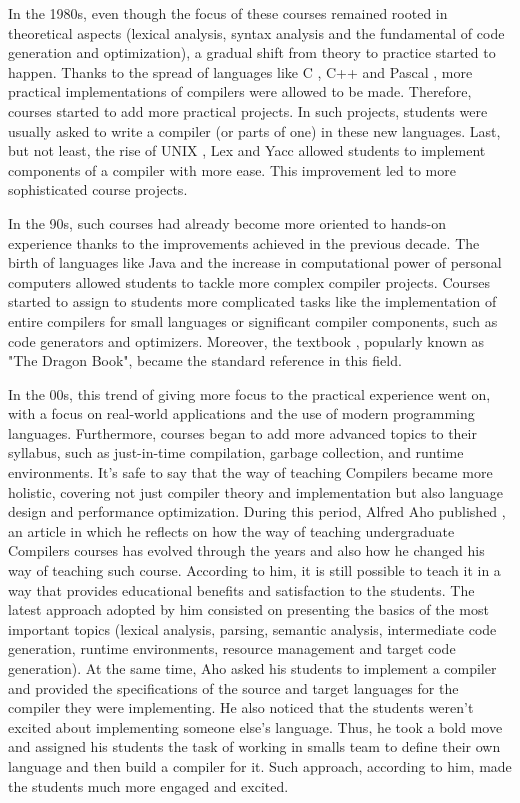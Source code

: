 In the 1980s, even though the focus of these courses remained rooted in theoretical aspects (lexical analysis, syntax analysis and the fundamental of code generation and optimization), a gradual shift from theory to practice started to happen. Thanks to the spread of languages like C \cite{kernighan1988c}, C++ \cite{strousrup2000c++} and Pascal \cite{wirth1971programming}, more practical implementations of compilers were allowed to be made. Therefore, courses started to add more practical projects. In such projects, students were usually asked to write a compiler (or parts of one) in these new languages. Last, but not least, the rise of UNIX \cite{ritchie1978unix}, Lex \cite{lesk1975lex} and Yacc \cite{johnson1975yacc} allowed students to implement components of a compiler with more ease. This improvement led to more sophisticated course projects.

In the 90s, such courses had already become more oriented to hands-on experience thanks to the improvements achieved in the previous decade. The birth of languages like Java \cite{java_17_official_specification} and the increase in computational power of personal computers allowed students to tackle more complex compiler projects. Courses started to assign to students more complicated tasks like the implementation of entire compilers for small languages or significant compiler components, such as code generators and optimizers. Moreover, the textbook \cite{aho1986compilers}, popularly known as "The Dragon Book", became the standard reference in this field.

In the 00s, this trend of giving more focus to the practical experience went on, with a focus on real-world applications and the use of modern programming languages. Furthermore, courses began to add more advanced topics to their syllabus, such as just-in-time compilation, garbage collection, and runtime environments. It's safe to say that the way of teaching Compilers became more holistic, covering not just compiler theory and implementation but also language design and performance optimization. During this period, Alfred Aho published \cite{aho2008teaching}, an article in which he reflects on how the way of teaching undergraduate Compilers courses has evolved through the years and also how he changed his way of teaching such course. According to him, it is still possible to teach it in a way that provides educational benefits and satisfaction to the students. The latest approach adopted by him consisted on presenting the basics of the most important topics (lexical analysis, parsing, semantic analysis, intermediate code generation, runtime environments, resource management and target code generation). At the same time, Aho asked his students to implement a compiler and provided the specifications of the source and target languages for the compiler they were implementing. He also noticed that the students weren't excited about implementing someone else's language. Thus, he took a bold move and assigned his students the task of working in smalls team to define their own
language and then build a compiler for it. Such approach, according to him, made the students much more engaged and excited.

